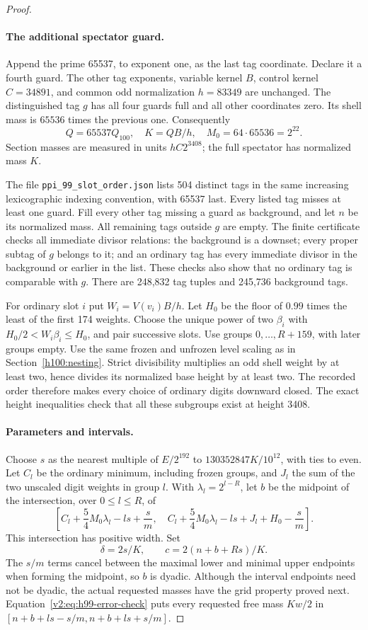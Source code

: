 \begin{proof}
\paragraph{The additional spectator guard.}
Append the prime 65537, to exponent one, as the last tag coordinate. Declare it a fourth guard. The other tag exponents, variable kernel $B$, control kernel $C=34891$, and common odd normalization $h=83349$ are unchanged. The distinguished tag $g$ has all four guards full and all other coordinates zero. Its shell mass is $65536$ times the previous one. Consequently
\[
 Q=65537Q_{100},\quad K=QB/h,\quad M_0=64\cdot65536=2^{22}.
\]
Section masses are measured in units $hC2^{3408}$; the full spectator has normalized mass $K$.

The file \texttt{ppi\_99\_slot\_order.json} lists 504 distinct tags in the same increasing lexicographic indexing convention, with 65537 last. Every listed tag misses at least one guard. Fill every other tag missing a guard as background, and let $n$ be its normalized mass. All remaining tags outside $g$ are empty. The finite certificate checks all immediate divisor relations: the background is a downset; every proper subtag of $g$ belongs to it; and an ordinary tag has every immediate divisor in the background or earlier in the list. These checks also show that no ordinary tag is comparable with $g$. There are 248,832 tag tuples and 245,736 background tags.

For ordinary slot $i$ put $W_i=V(v_i)B/h$. Let $H_0$ be the floor of $0.99$ times the least of the first 174 weights. Choose the unique power of two $\beta_i$ with $H_0/2<W_i\beta_i\leq H_0$, and pair successive slots. Use groups $0,\ldots,R+159$, with later groups empty. Use the same frozen and unfrozen level scaling as in Section~\ref{h100:nesting}. Strict divisibility multiplies an odd shell weight by at least two, hence divides its normalized base height by at least two. The recorded order therefore makes every choice of ordinary digits downward closed. The exact height inequalities check that all these subgroups exist at height 3408.

\paragraph{Parameters and intervals.}
Choose $s$ as the nearest multiple of $E/2^{192}$ to $130352847K/10^{12}$, with ties to even. Let $C_l$ be the ordinary minimum, including frozen groups, and $J_l$ the sum of the two unscaled digit weights in group $l$. With $\lambda_l=2^{l-R}$, let $b$ be the midpoint of the intersection, over $0\leq l\leq R$, of
\[
 \left[C_l+\frac54M_0\lambda_l-ls+\frac{s}{m},\quad
 C_l+\frac54M_0\lambda_l-ls+J_l+H_0-\frac{s}{m}\right].
\]
This intersection has positive width. Set
\[
 \delta=2s/K,\qquad c=2(n+b+Rs)/K.
\]
The $s/m$ terms cancel between the maximal lower and minimal upper endpoints when forming the midpoint, so $b$ is dyadic. Although the interval endpoints need not be dyadic, the actual requested masses have the grid property proved next. Equation~\eqref{v2:eq:h99-error-check} puts every requested free mass $Kw/2$ in
$[n+b+ls-s/m,n+b+ls+s/m]$.


\end{proof}
